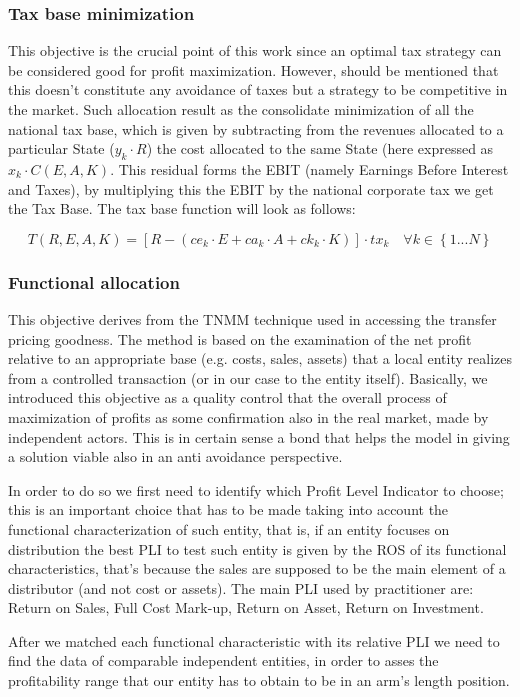 \documentclass{article}
\begin{document}
\subsubsection{Tax base minimization}
This objective is the crucial point of this work since an optimal tax strategy can be considered good for profit maximization. However, should be mentioned that this doesn't constitute any avoidance of taxes but a strategy to be competitive in the market. Such allocation result as the consolidate minimization of all the national tax base, which is given by subtracting from the revenues allocated to a particular State ($y_k \cdot R$) the cost allocated to the same State (here expressed as $x_k \cdot C(E, A,K)$. This residual forms the EBIT (namely Earnings Before Interest and Taxes), by multiplying this the EBIT by the national corporate tax we get the Tax Base. The tax base function will look as follows:

\[
T(R,E,A,K)= [R-(ce_k\cdot E+ca_k\cdot A+ck_k\cdot K)]\cdot tx_k \quad \forall k \in \left\{1...N\right\}
\]

\subsubsection{Functional allocation}
This objective derives from the TNMM technique used in accessing the transfer pricing goodness. The method is based on the examination of the net profit relative to an appropriate base (e.g. costs, sales, assets) that a local entity realizes from a controlled transaction (or in our case to the entity itself). Basically, we introduced this objective as a quality control that the overall process of maximization of profits as some confirmation also in the real market, made by independent actors. This is in certain sense a bond that helps the model in giving a solution viable also in an anti avoidance perspective.

In order to do so we first need to identify which Profit Level Indicator to choose; this is an important choice that has to be made taking into account the functional characterization of such entity, that is, if an entity focuses on distribution the best PLI to test such entity is given by the ROS of its functional characteristics, that's because the sales are supposed to be the main element of a distributor (and not cost or assets). The main PLI used by practitioner are: Return on Sales, Full Cost Mark-up, Return on Asset, Return on Investment.

After we matched each functional characteristic with its relative PLI we need to find the data of comparable independent entities, in order to asses the profitability range that our entity has to obtain to be in an arm's length position.
\end{document}
